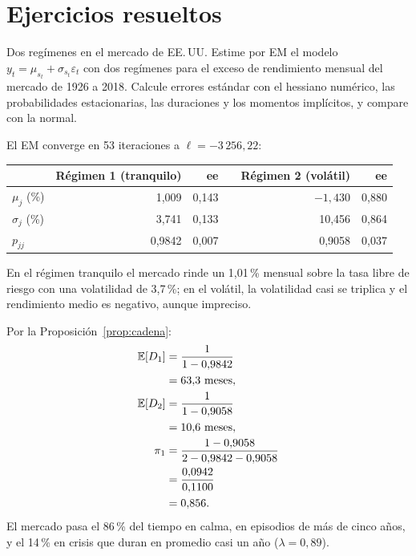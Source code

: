 \section{Ejercicios resueltos}

\begin{ejresuelto}{Dos regímenes en el mercado de EE.\,UU.}\label{ej:mercado2}
\enunciado Estime por EM el modelo $y_t=\mu_{s_t}+\sigma_{s_t}\varepsilon_t$ con dos regímenes para el exceso de rendimiento
mensual del mercado de 1926 a 2018. Calcule errores estándar con el hessiano numérico, las probabilidades estacionarias, las
duraciones y los momentos implícitos, y compare con la normal.

\solucion
{} El EM converge en 53 iteraciones a $\ell=-3\,256{,}22$:
\begin{center}\small
\begin{tabular}{@{}lrrlrr@{}}
\toprule
 & Régimen 1 (tranquilo) & ee & & Régimen 2 (volátil) & ee \\
\midrule
$\mu_j$ (\%) & 1,009 & 0,143 & & $-1{,}430$ & 0,880 \\
$\sigma_j$ (\%) & 3,741 & 0,133 & & 10,456 & 0,864 \\
$p_{jj}$ & 0,9842 & 0,007 & & 0,9058 & 0,037 \\
\bottomrule
\end{tabular}
\end{center}
En el régimen tranquilo el mercado rinde un 1,01\,\% mensual sobre la tasa libre de riesgo con una volatilidad de 3,7\,\%;
en el volátil, la volatilidad casi se triplica y el rendimiento medio es negativo, aunque impreciso.

 Por la Proposición~\ref{prop:cadena}:
\begin{align*}
  \mathbb{E}[D_1] &= \frac{1}{1-0{,}9842}\\
          &= 63{,}3\ \text{meses},\\
  \mathbb{E}[D_2] &= \frac{1}{1-0{,}9058}\\
          &= 10{,}6\ \text{meses},\\
  \pi_1 &= \frac{1-0{,}9058}{2-0{,}9842-0{,}9058}\\
        &= \frac{0{,}0942}{0{,}1100}\\
        &= 0{,}856 .
\end{align*}
El mercado pasa el 86\,\% del tiempo en calma, en episodios de más de cinco años, y el 14\,\% en crisis que duran en promedio
casi un año ($\lambda=0{,}89$).


\end{ejresuelto}
